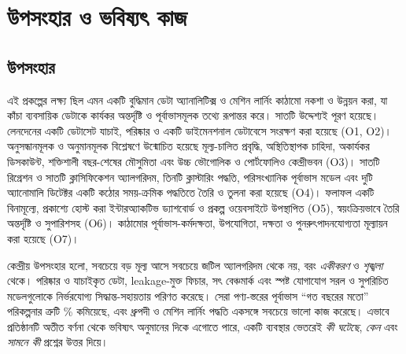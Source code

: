 \chapter{উপসংহার ও ভবিষ্যৎ কাজ}\label{ch:conclusion}

\section{উপসংহার}
এই প্রকল্পের লক্ষ্য ছিল এমন একটি বুদ্ধিমান ডেটা অ্যানালিটিক্স ও মেশিন লার্নিং কাঠামো নকশা ও উন্নয়ন করা, যা কাঁচা ব্যবসায়িক ডেটাকে কার্যকর
অন্তর্দৃষ্টি ও পূর্বাভাসমূলক তথ্যে রূপান্তর করে। সাতটি উদ্দেশ্যই পূরণ হয়েছে। \NRows লেনদেনের একটি ডেটাসেট যাচাই, পরিষ্কার ও একটি
ডাইমেনশনাল ডেটাবেসে সংরক্ষণ করা হয়েছে (O1, O2)। অনুসন্ধানমূলক ও অনুমানমূলক বিশ্লেষণে উন্মোচিত হয়েছে মূল্য-চালিত প্রবৃদ্ধি,
অস্থিতিস্থাপক চাহিদা, অকার্যকর ডিসকাউন্ট, শক্তিশালী বছর-শেষের মৌসুমিতা এবং উচ্চ ভৌগোলিক ও পোর্টফোলিও কেন্দ্রীভবন (O3)। সাতটি রিগ্রেশন
ও সাতটি ক্লাসিফিকেশন অ্যালগরিদম, তিনটি ক্লাস্টারিং পদ্ধতি, পরিসংখ্যানিক পূর্বাভাস মডেল এবং দুটি অ্যানোমালি ডিটেক্টর একটি কঠোর
সময়-ক্রমিক পদ্ধতিতে তৈরি ও তুলনা করা হয়েছে (O4)। ফলাফল একটি বিনামূল্যে, প্রকাশ্যে হোস্ট করা ইন্টারঅ্যাকটিভ ড্যাশবোর্ড ও প্রকল্প
ওয়েবসাইটে উপস্থাপিত (O5), স্বয়ংক্রিয়ভাবে তৈরি অন্তর্দৃষ্টি ও সুপারিশসহ (O6)। কাঠামোর পূর্বাভাস-কর্মদক্ষতা, উপযোগিতা, দক্ষতা ও
পুনরুৎপাদনযোগ্যতা মূল্যায়ন করা হয়েছে (O7)।

কেন্দ্রীয় উপসংহার হলো, সবচেয়ে বড় মূল্য আসে সবচেয়ে জটিল অ্যালগরিদম থেকে নয়, বরং \emph{একীকরণ} ও \emph{শৃঙ্খলা} থেকে। পরিষ্কার ও যাচাইকৃত
ডেটা, leakage-মুক্ত ফিচার, সৎ বেঞ্চমার্ক এবং স্পষ্ট যোগাযোগ সরল ও সুপরিচিত মডেলগুলোকে নির্ভরযোগ্য সিদ্ধান্ত-সহায়তায় পরিণত করেছে। সেরা
পণ্য-স্তরের পূর্বাভাস ``গত বছরের মতো'' পরিকল্পনার ত্রুটি \GainVsSNaive\% কমিয়েছে, এবং ধ্রুপদী ও মেশিন লার্নিং পদ্ধতি একসঙ্গে সবচেয়ে
ভালো কাজ করেছে। এভাবে প্রতিষ্ঠানটি অতীত বর্ণনা থেকে ভবিষ্যৎ অনুমানের দিকে এগোতে পারে, একটি ব্যবস্থার ভেতরেই \emph{কী ঘটেছে},
\emph{কেন} এবং \emph{সামনে কী} প্রশ্নের উত্তর দিয়ে।

